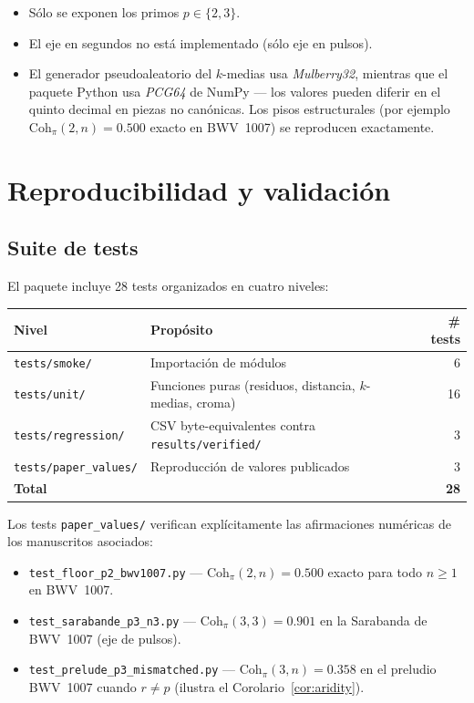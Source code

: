 \documentclass[11pt,a4paper,oneside]{article}
\theoremstyle{plain}
\theoremstyle{definition}
\theoremstyle{remark}
\newcommand{\Cohpi}{\mathrm{Coh}_\pi}
\newcommand{\code}[1]{\texttt{\small #1}}
\begin{document}
\begin{itemize}[noitemsep]
  \item Sólo se exponen los primos $p \in \{2, 3\}$.
  \item El eje en segundos no está implementado (sólo eje en pulsos).
  \item El generador pseudoaleatorio del $k$-medias usa
        \emph{Mulberry32}, mientras que el paquete Python usa
        \emph{PCG64} de NumPy --- los valores pueden diferir en el
        quinto decimal en piezas no canónicas. Los pisos estructurales
        (por ejemplo $\Cohpi(2,n) = 0.500$ exacto en BWV~1007) se
        reproducen exactamente.
\end{itemize}

\section{Reproducibilidad y validación}\label{sec:repro}

\subsection{Suite de tests}

El paquete incluye 28 tests organizados en cuatro niveles:

\begin{tabularx}{\linewidth}{lXr}
  \toprule
  \textbf{Nivel} & \textbf{Propósito} & \textbf{\# tests} \\
  \midrule
  \code{tests/smoke/}        & Importación de módulos              & 6 \\
  \code{tests/unit/}         & Funciones puras (residuos, distancia, $k$-medias, croma) & 16 \\
  \code{tests/regression/}   & CSV byte-equivalentes contra \code{results/verified/} & 3 \\
  \code{tests/paper\_values/}& Reproducción de valores publicados  & 3 \\
  \midrule
  \textbf{Total} &  & \textbf{28} \\
  \bottomrule
\end{tabularx}

Los tests \code{paper\_values/} verifican explícitamente las
afirmaciones numéricas de los manuscritos asociados:

\begin{itemize}[noitemsep]
  \item \code{test\_floor\_p2\_bwv1007.py} ---
        $\Cohpi(2,n) = 0.500$ exacto para todo $n \geq 1$ en BWV~1007.
  \item \code{test\_sarabande\_p3\_n3.py} ---
        $\Cohpi(3,3) = 0.901$ en la Sarabanda de BWV~1007 (eje
        de pulsos).
  \item \code{test\_prelude\_p3\_mismatched.py} ---
        $\Cohpi(3,n) = 0.358$ en el preludio BWV~1007 cuando $r \neq p$
        (ilustra el Corolario~\ref{cor:aridity}).
\end{itemize}
\end{document}
